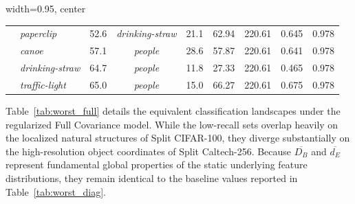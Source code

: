 \begin{table}[htbp]
\begin{adjustbox}{width=0.95\columnwidth, center}
\begin{tabular}{llccccccc}
			& \textit{paperclip}      & 52.6 & \textit{drinking-straw} & 21.1 & 62.94 & 220.61 & 0.645 & 0.978 \\
			& \textit{canoe}          & 57.1 & \textit{people}         & 28.6 & 57.87 & 220.61 & 0.641 & 0.978 \\
			& \textit{drinking-straw} & 64.7 & \textit{people}         & 11.8 & 27.33 & 220.61 & 0.465 & 0.978 \\
			& \textit{traffic-light}  & 65.0 & \textit{people}         & 15.0 & 66.27 & 220.61 & 0.675 & 0.978 \\
			\bottomrule
		\end{tabular}
	\end{adjustbox}
\end{table}

Table~\ref{tab:worst_full} details the equivalent classification landscapes under the regularized Full Covariance model. While the low-recall sets overlap heavily on the localized natural structures of Split CIFAR-100, they diverge substantially on the high-resolution object coordinates of Split Caltech-256. Because $\overline{D_B}$ and $\overline{d_E}$ represent fundamental global properties of the static underlying feature distributions, they remain identical to the baseline values reported in Table~\ref{tab:worst_diag}. 


